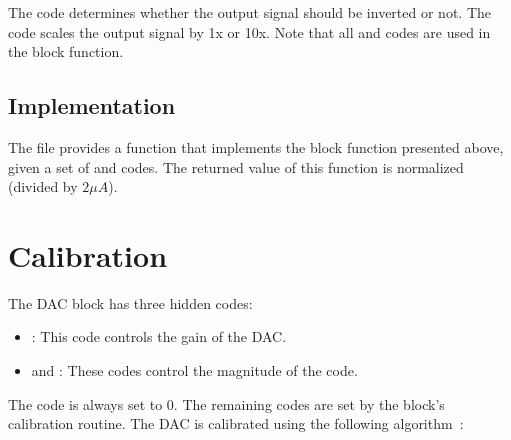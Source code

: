 The  code determines whether the output signal should be inverted or
not. The  code scales the output signal by 1x or 10x. Note
that all \static and \dynamic codes are used in the block function.

\subsection{\analoglib Implementation}
The  file provides a  function that implements the
block function presented above, given a set of \dynamic and \static codes. The
returned value of this function is normalized (divided by $2 \mu A$).

\section{Calibration}
The DAC block has three hidden codes:
\begin{itemize}
\item{}: This code controls the gain of the DAC.
\item{} and : These codes control the magnitude of the
   code.
\end{itemize}
The  code is always set to $0$. The remaining codes are set by the block's
calibration routine. The DAC is calibrated using the following
algorithm~\cite{dac_calib.cpp}:

\begin{algorithmic}
    \EndFor
  \EndFor

  \EndFor
\end{algorithmic}

